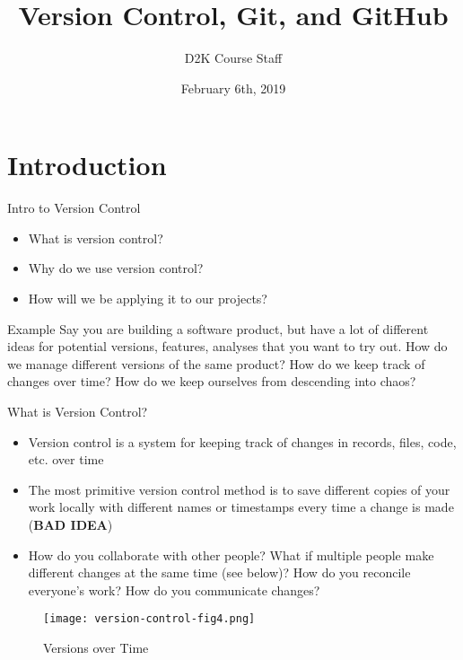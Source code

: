 \documentclass{beamer}
\title[Your Short Title]{Version Control, Git, and GitHub}
\author{D2K Course Staff}
\institute{Rice University}
\date{February 6th, 2019}
\begin{document}
\begin{frame}
  \titlepage
\end{frame}


\section{Introduction}

\begin{frame}{Intro to Version Control}

\begin{itemize}
  \item What is version control?
  \item Why do we use version control?
  \item How will we be applying it to our projects?
\end{itemize}

\vskip 1cm

\begin{block}{Example}
Say you are building a software product, but have a lot of different ideas for potential versions, features, analyses that you want to try out. How do we manage different versions of the same product? How do we keep track of changes over time? How do we keep ourselves from descending into chaos?
\end{block}

\end{frame}


\begin{frame}{What is Version Control?}

\begin{itemize}
  \item Version control is a system for keeping track of changes in records, files, code, etc. over time
  \item The most primitive version control method is to save different copies of your work locally with different names or timestamps every time a change is made (\textbf{BAD IDEA})
  \item How do you collaborate with other people? What if multiple people make different changes at the same time (see below)? How do you reconcile everyone's work? How do you communicate changes?
  
\end{itemize}

\begin{figure}
\texttt{[image: version-control-fig4.png]}
\caption{\label{fig:your-figure}Versions over Time}
\end{figure}

\end{frame}
\end{document}
